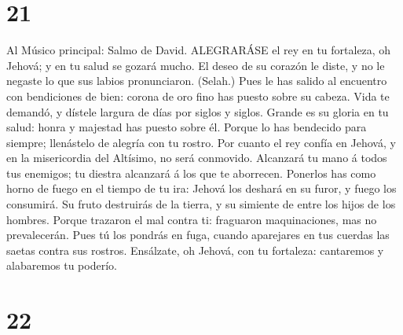 \hypertarget{section-20}{%
\section{21}\label{section-20}}

 Al Músico principal: Salmo de David. ALEGRARÁSE el rey en
tu fortaleza, oh Jehová; y en tu salud se gozará mucho.  El
deseo de su corazón le diste, y no le negaste lo que sus labios
pronunciaron. (Selah.)  Pues le has salido al encuentro con
bendiciones de bien: corona de oro fino has puesto sobre su cabeza.
 Vida te demandó, y dístele largura de días por siglos y
siglos.  Grande es su gloria en tu salud: honra y majestad
has puesto sobre él.  Porque lo has bendecido para siempre;
llenástelo de alegría con tu rostro.  Por cuanto el rey
confía en Jehová, y en la misericordia del Altísimo, no será conmovido.
 Alcanzará tu mano á todos tus enemigos; tu diestra
alcanzará á los que te aborrecen.  Ponerlos has como horno
de fuego en el tiempo de tu ira: Jehová los deshará en su furor, y fuego
los consumirá.  Su fruto destruirás de la tierra, y su
simiente de entre los hijos de los hombres.  Porque
trazaron el mal contra ti: fraguaron maquinaciones, mas no prevalecerán.
 Pues tú los pondrás en fuga, cuando aparejares en tus
cuerdas las saetas contra sus rostros.  Ensálzate, oh
Jehová, con tu fortaleza: cantaremos y alabaremos tu poderío.

\hypertarget{section-21}{%
\section{22}\label{section-21}}

